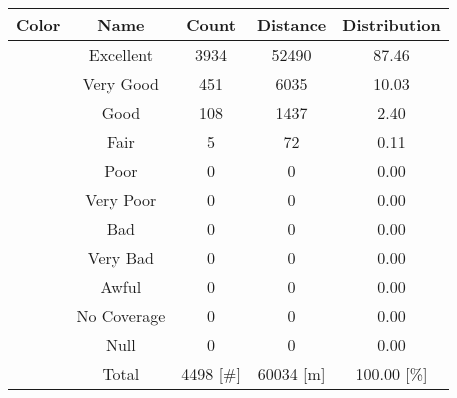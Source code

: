 \begin{tabular}{|c|c|c|c|c|}\hline
\rowcolor{Plum!20}
Color&Name&Count&Distance&Distribution\\\hline\hline
\cellcolor[HTML]{00703c} &Excellent&3934&52490&87.46\\\hline
\cellcolor[HTML]{00a032} &Very Good&451&6035&10.03\\\hline
\cellcolor[HTML]{00d228} &Good&108&1437&2.40\\\hline
\cellcolor[HTML]{ffff00} &Fair&5&72&0.11\\\hline
\cellcolor[HTML]{ffaa00} &Poor&0&0&0.00\\\hline
\cellcolor[HTML]{fa6400} &Very Poor&0&0&0.00\\\hline
\cellcolor[HTML]{ff0000} &Bad&0&0&0.00\\\hline
\cellcolor[HTML]{dc143c} &Very Bad&0&0&0.00\\\hline
\cellcolor[HTML]{820000} &Awful&0&0&0.00\\\hline
\cellcolor[HTML]{aaaaaa} &No Coverage&0&0&0.00\\\hline
\cellcolor[HTML]{000000} &Null&0&0&0.00\\\hline
\cellcolor[HTML]{ffffff} &Total&4498 [\#]&60034 [m]&100.00 [\%]\\\hline
\end{tabular}
